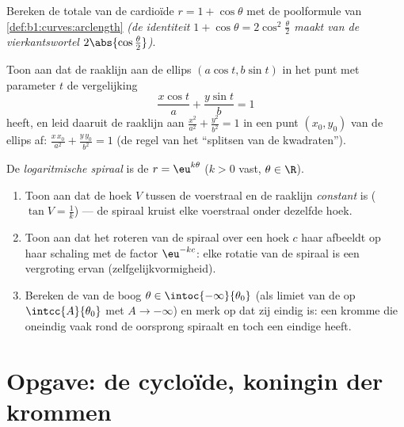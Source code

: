 \begin{exercise}[$\star\star$]\label{exo:b1:curves:10}
Bereken de totale  van de cardioïde $r = 1 + \cos\theta$ met
de poolformule van \cref{def:b1:curves:arclength} \emph{(de
identiteit $1 + \cos\theta = 2\cos^2\frac\theta2$ maakt van de
vierkantswortel $2\abs{\cos\frac\theta2}$)}.
\end{exercise}

\begin{exercise}[$\star\star$]\label{exo:b1:curves:11}
Toon aan dat de raaklijn aan de ellips $(a\cos t, b\sin t)$ in het
punt met parameter $t$ de vergelijking
\[
\frac{x\cos t}{a} + \frac{y\sin t}{b} = 1
\]
heeft, en leid daaruit de raaklijn aan $\frac{x^2}{a^2} +
\frac{y^2}{b^2} = 1$ in een punt $(x_0, y_0)$ van de ellips af:
$\frac{x\,x_0}{a^2} + \frac{y\,y_0}{b^2} = 1$ (de regel van het
``splitsen van de kwadraten'').
\end{exercise}

\begin{exercise}[$\star\star\star$]\label{exo:b1:curves:12}
De \emph{logaritmische spiraal} is de  $r =
\eu^{k\theta}$ ($k > 0$ vast, $\theta \in \R$).
\begin{enumerate}
  \item Toon aan dat de hoek $V$ tussen de voerstraal en de
        raaklijn \emph{constant} is ($\tan V = \frac1k$) --- de
        spiraal kruist elke voerstraal onder dezelfde hoek.
  \item Toon aan dat het roteren van de spiraal over een hoek $c$
        haar afbeeldt op haar schaling met de factor $\eu^{-kc}$:
        elke rotatie van de spiraal is een vergroting ervan
        (zelfgelijkvormigheid).
  \item Bereken de  van de boog $\theta \in
        \intoc{-\infty}{\theta_0}$ (als limiet van de  op
        $\intcc{A}{\theta_0}$ met $A \to -\infty$) en merk op dat
        zij eindig is: een kromme die oneindig vaak rond de
        oorsprong spiraalt en toch een eindige  heeft.
\end{enumerate}
\end{exercise}

\section{Opgave: de cycloïde, koningin der krommen}

